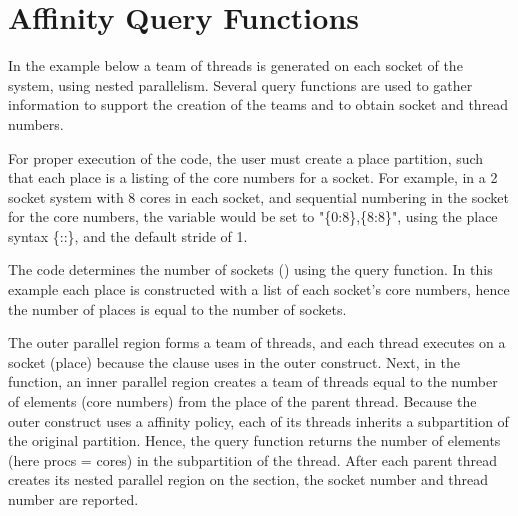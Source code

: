 \section{Affinity Query Functions}
\label{sec: affinity_query}

In the example below a team of threads is generated on each socket of
the system, using nested parallelism. Several query functions are used
to gather information to support the creation of the teams and to obtain 
socket and thread numbers.

For proper execution of the code, the user must create a place partition, such that
each place is a listing of the core numbers for a socket. For example,
in a 2 socket system with 8 cores in each socket, and sequential numbering
in the socket for the core numbers, the  variable would be set
to "\{0:8\},\{8:8\}", using the place syntax \{::\},
and the default stride of 1.

The code determines the number of sockets ()
using the  query function.
In this example each place is constructed with a list of 
each socket's core numbers, hence the number of places is equal
to the number of sockets. 

The outer parallel region forms a team of threads, and each thread 
executes on a socket (place) because the  clause uses 
 in the outer  construct.
Next, in the  function, an inner parallel region creates a team 
of threads equal to the number of elements (core numbers) from the place
of the parent thread. Because the outer  construct uses 
a  affinity policy, each of its threads inherits a subpartition of 
the original partition.  Hence, the  query function
returns the number of elements (here procs = cores) in the subpartition of the thread.  
After each parent thread creates its nested parallel region on the section,
the socket number and thread number are reported.

